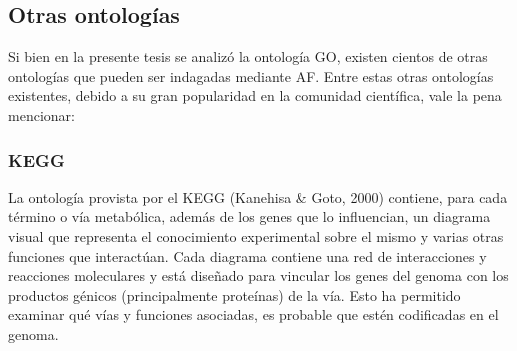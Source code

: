 \documentclass[12pt,twoside]{reedthesis}
\begin{document}
\hypertarget{otras-ontologias}{%
\subsection{Otras ontologías}\label{otras-ontologias}}

Si bien en la presente tesis se analizó la ontología GO, existen cientos de otras ontologías que pueden ser indagadas mediante AF. Entre estas otras ontologías existentes, debido a su gran popularidad en la comunidad científica, vale la pena mencionar:

\hypertarget{kegg}{%
\subsubsection{KEGG}\label{kegg}}

La ontología provista por el KEGG (Kanehisa \& Goto, 2000) contiene, para cada término o vía metabólica, además de los genes que lo influencian, un diagrama visual que representa el conocimiento experimental sobre el mismo y varias otras funciones que interactúan. Cada diagrama contiene una red de interacciones y reacciones moleculares y está diseñado para vincular los genes del genoma con los productos génicos (principalmente proteínas) de la vía. Esto ha permitido examinar qué vías y funciones asociadas, es probable que estén codificadas en el genoma.

\par
\end{document}
